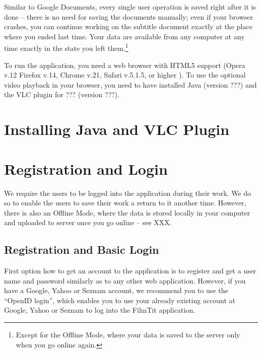 Similar to Google Documents, every single user operation is saved right after it is done -- there is no need for saving the documents manually; even if your browser crashes, you can continue working on the subtitle document exactly at the place where you ended last time. Your data are available from any computer at any time exactly in the state you left them.\footnote{Except for the Offline Mode, where your data is saved to the server only when you go online again.}

To run the application, you need a web browser with HTML5 support (Opera v.12
Firefox v.14, Chrome v.21, Safari v.5.1.5, or higher ). To use the optional video playback in your browser, you need to have installed Java (version ???) and the VLC plugin for ??? (version ???).

\section{Installing Java and VLC Plugin}


\section{Registration and Login}

We require the users to be logged into the application during their work. We do so to enable the users to save their work a return to it another time. However, there is also an Offline Mode, where the data is stored locally in your computer and uploaded to server once you go online -- see XXX.

\subsection{Registration and Basic Login}

First option how to get an account to the application is to register and get a user name and password similarly as to any other web application. However, if you have a Google, Yahoo or Seznam account, we recommend you to use the ``OpenID login'', which enables you to use your already existing account at Google, Yahoo or Seznam to log into the FilmTit application.

